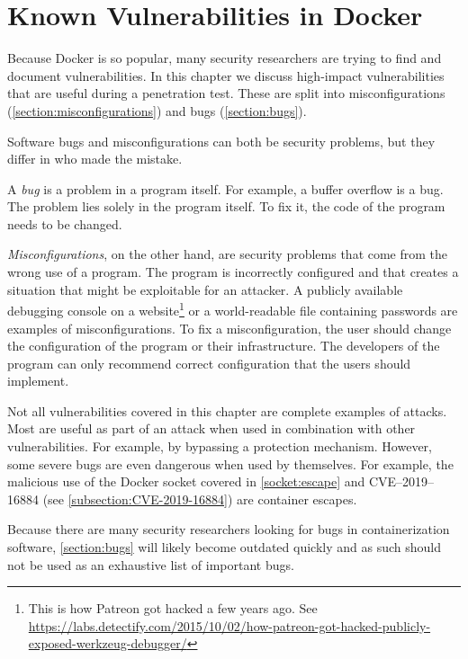 \chapter{Known Vulnerabilities in Docker}\label{chapter:vulnerabilities}
Because Docker is so popular, many security researchers are trying to find and document vulnerabilities. In this chapter we discuss high-impact vulnerabilities that are useful during a penetration test. These are split into misconfigurations (\autoref{section:misconfigurations}) and bugs (\autoref{section:bugs}).

\medskip

Software bugs and misconfigurations can both be security problems, but they differ in who made the mistake.

A \emph{bug} is a problem in a program itself. For example, a buffer overflow is a bug. The problem lies solely in the program itself. To fix it, the code of the program needs to be changed.

\emph{Misconfigurations}, on the other hand, are security problems that come from the wrong use of a program. The program is incorrectly configured and that creates a situation that might be exploitable for an attacker. A publicly available debugging console on a website\footnote{This is how Patreon got hacked a few years ago. See \url{https://labs.detectify.com/2015/10/02/how-patreon-got-hacked-publicly-exposed-werkzeug-debugger/}} or a world-readable file containing passwords are examples of misconfigurations. To fix a misconfiguration, the user should change the configuration of the program or their infrastructure. The developers of the program can only recommend correct configuration that the users should implement.

\medskip

Not all vulnerabilities covered in this chapter are complete examples of attacks. Most are useful as part of an attack when used in combination with other vulnerabilities. For example, by bypassing a protection mechanism. However, some severe bugs are even dangerous when used by themselves. For example, the malicious use of the Docker socket covered in \autoref{socket:escape} and CVE--2019--16884 (see \autoref{subsection:CVE-2019-16884}) are container escapes.

\medskip

Because there are many security researchers looking for bugs in containerization software, \autoref{section:bugs} will likely become outdated quickly and as such should not be used as an exhaustive list of important bugs.

